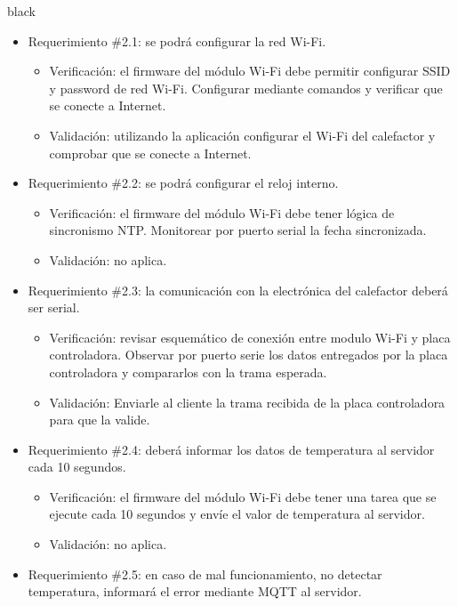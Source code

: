 \documentclass[
11pt, %
codirector, %
]{charter}
\begin{document}
\begin{consigna}{black}
\begin{itemize}
\item Requerimiento \#2.1: se podrá configurar la red Wi-Fi.

\begin{itemize}
	\item Verificación: el firmware del módulo Wi-Fi debe permitir configurar SSID y password de red Wi-Fi. Configurar mediante comandos y verificar que se conecte a Internet. 
	\item Validación: utilizando la aplicación configurar el Wi-Fi del calefactor y comprobar que se conecte a Internet.
\end{itemize}

\item Requerimiento \#2.2: se podrá configurar el reloj interno.

\begin{itemize}
	\item Verificación: el firmware del módulo Wi-Fi debe tener lógica de sincronismo NTP. Monitorear por puerto serial la fecha sincronizada.  
	\item Validación: no aplica.
\end{itemize}

\item Requerimiento \#2.3: la comunicación con la electrónica del calefactor deberá ser serial.

\begin{itemize}
	\item Verificación: revisar esquemático de conexión entre modulo Wi-Fi y placa controladora. Observar por puerto serie los datos entregados por la placa controladora y compararlos con la trama esperada.
	\item Validación: Enviarle al cliente la trama recibida de la placa controladora para que la valide.
\end{itemize}

\item Requerimiento \#2.4: deberá informar los datos de temperatura al servidor cada 10 segundos.

\begin{itemize}
	\item Verificación: el firmware del módulo Wi-Fi debe tener una tarea que se ejecute cada 10 segundos y envíe el valor de temperatura al servidor.
	\item Validación: no aplica.
\end{itemize}

\item Requerimiento \#2.5: en caso de mal funcionamiento, no detectar temperatura, informará el error mediante MQTT al servidor.


\end{itemize}
\end{consigna}
\end{document}
